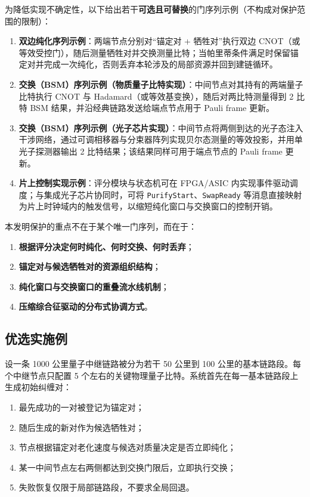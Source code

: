 \documentclass[12pt,a4paper]{article}
\begin{document}
为降低实现不确定性，以下给出若干\textbf{可选且可替换}的门序列示例（不构成对保护范围的限制）：
\begin{enumerate}[label=(\arabic*)]
    \item \textbf{双边纯化序列示例}：两端节点分别对“锚定对 + 牺牲对”执行双边 CNOT（或等效受控门），随后测量牺牲对并交换测量比特；当帕里蒂条件满足时保留锚定对并完成一次纯化，否则丢弃本轮涉及的局部资源并回到建链循环。
    \item \textbf{交换（BSM）序列示例（物质量子比特实现）}：中间节点对其持有的两端量子比特执行 CNOT 与 Hadamard（或等效基变换），随后对两比特测量得到 2 比特 BSM 结果，并沿经典链路发送给端点节点用于 Pauli frame 更新。
    \item \textbf{交换（BSM）序列示例（光子芯片实现）}：中间节点将两侧到达的光子态注入干涉网络，通过可调相移器与分束器阵列实现贝尔态测量的等效投影，并用单光子探测器输出 2 比特结果；该结果同样可用于端点节点的 Pauli frame 更新。
    \item \textbf{片上控制实现示例}：评分模块与状态机可在 FPGA/ASIC 内实现事件驱动调度；与集成光子芯片协同时，可将 \texttt{PurifyStart}、\texttt{SwapReady} 等消息直接映射为片上时钟域内的触发信号，以缩短纯化窗口与交换窗口的控制开销。
\end{enumerate}

本发明保护的重点不在于某个唯一门序列，而在于：
\begin{enumerate}[label=(\arabic*)]
    \item \textbf{根据评分决定何时纯化、何时交换、何时丢弃}；
    \item \textbf{锚定对与候选牺牲对的资源组织结构}；
    \item \textbf{纯化窗口与交换窗口的重叠流水线机制}；
    \item \textbf{压缩综合征驱动的分布式协调方式}。
\end{enumerate}

\subsection{优选实施例}

设一条 1000 公里量子中继链路被分为若干 50 公里到 100 公里的基本链路段。每个中继节点只配置 5 个左右的关键物理量子比特。系统首先在每一基本链路段上生成初始纠缠对：
\begin{enumerate}[label=(\arabic*)]
    \item 最先成功的一对被登记为锚定对；
    \item 随后生成的新对作为候选牺牲对；
    \item 节点根据锚定对老化速度与候选对质量决定是否立即纯化；
    \item 某一中间节点左右两侧都达到交换门限后，立即执行交换；
    \item 失败恢复仅限于局部链路段，不要求全局回退。
\end{enumerate}
\end{document}
